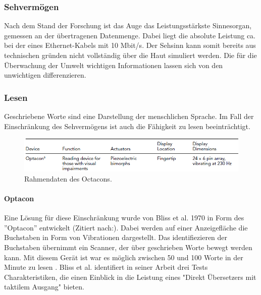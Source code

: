 \documentclass{llncs}					%
\begin{document}
\subsubsection{Sehvermögen}
Nach dem Stand der Forschung ist das Auge das Leistungsstärkste Sinnesorgan, gemessen an der übertragenen Datenmenge\cite{Koch2006}. Dabei liegt die absolute Leistung ca. bei der eines Ethernet-Kabels mit 10 Mbit/s\cite{Koch2006}. Der Sehsinn kann somit bereits aus technischen gründen nicht vollständig über die Haut simuliert werden.
Die für die Überwachung der Umwelt wichtigen Informationen lassen sich von den unwichtigen differenzieren.

\subsubsection{Lesen} Geschriebene Worte sind eine Darstellung der menschlichen Sprache. Im Fall der Einschränkung des Sehvermögens ist auch die Fähigkeit zu lesen beeinträchtigt.

\begin{figure}[htbp]
	\begin{center}
		\includegraphics[width = 12cm]{Grafiken/4-Octacon-Data.png}
		\caption{Rahmendaten des Octacons.\cite{doi:10.1518/001872008X250638}}
		\label{4-Octacon-Data}
	\end{center}
\end{figure}

\paragraph{Optacon} Eine Lösung für diese Einschränkung wurde von Bliss et al. 1970 in Form des ''Optacon'' entwickelt (Zitiert nach:\cite{doi:10.1518/001872008X250638}). Dabei werden auf einer Anzeigefläche die Buchstaben in Form von Vibrationen dargestellt. Das identifiezieren der Buchstaben übernimmt ein Scanner, der über geschrieben Worte bewegt werden kann. Mit diesem Gerät ist war es möglich zwischen 50 und 100 Worte in der Minute zu lesen \cite{doi:10.1518/001872008X250638}.
Bliss et al. \cite{4081931} identifiert in seiner Arbeit drei Tests Charakteristiken, die einen Einblick in die Leistung eines "Direkt Übersetzers mit taktilem Ausgang" \cite{4081931} bieten.
\end{document}
